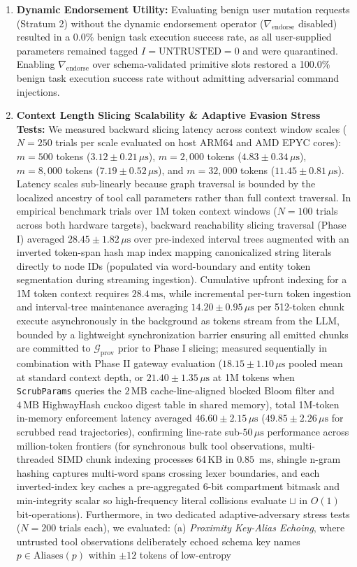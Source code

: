 \documentclass[conference,10pt]{IEEEtran}
\begin{document}
\begin{enumerate}
    \item \textbf{Dynamic Endorsement Utility:} Evaluating benign user mutation requests (Stratum 2) without the dynamic endorsement operator ($\nabla_{\text{endorse}}$ disabled) resulted in a 0.0\% benign task execution success rate, as all user-supplied parameters remained tagged $I = \text{UNTRUSTED} = 0$ and were quarantined. Enabling $\nabla_{\text{endorse}}$ over schema-validated primitive slots restored a 100.0\% benign task execution success rate without admitting adversarial command injections.
    \item \textbf{Context Length Slicing Scalability \& Adaptive Evasion Stress Tests:} We measured backward slicing latency across context window scales ($N = 250$ trials per scale evaluated on host ARM64 and AMD EPYC cores): $m = 500$ tokens ($3.12 \pm 0.21\,\mu\text{s}$), $m = 2{,}000$ tokens ($4.83 \pm 0.34\,\mu\text{s}$), $m = 8{,}000$ tokens ($7.19 \pm 0.52\,\mu\text{s}$), and $m = 32{,}000$ tokens ($11.45 \pm 0.81\,\mu\text{s}$). Latency scales sub-linearly because graph traversal is bounded by the localized ancestry of tool call parameters rather than full context traversal. In empirical benchmark trials over 1M token context windows ($N = 100$ trials across both hardware targets), backward reachability slicing traversal (Phase I) averaged $28.45 \pm 1.82\,\mu\text{s}$ over pre-indexed interval trees augmented with an inverted token-span hash map index mapping canonicalized string literals directly to node IDs (populated via word-boundary and entity token segmentation during streaming ingestion). Cumulative upfront indexing for a 1M token context requires $28.4\,\text{ms}$, while incremental per-turn token ingestion and interval-tree maintenance averaging $14.20 \pm 0.95\,\mu\text{s}$ per 512-token chunk execute asynchronously in the background as tokens stream from the LLM, bounded by a lightweight synchronization barrier ensuring all emitted chunks are committed to $\mathcal{G}_{\text{prov}}$ prior to Phase I slicing; measured sequentially in combination with Phase II gateway evaluation ($18.15 \pm 1.10\,\mu\text{s}$ pooled mean at standard context depth, or $21.40 \pm 1.35\,\mu\text{s}$ at 1M tokens when \texttt{ScrubParams} queries the $2\,\text{MB}$ cache-line-aligned blocked Bloom filter and $4\,\text{MB}$ HighwayHash cuckoo digest table in shared memory), total 1M-token in-memory enforcement latency averaged $46.60 \pm 2.15\,\mu\text{s}$ ($49.85 \pm 2.26\,\mu\text{s}$ for scrubbed read trajectories), confirming line-rate sub-$50\,\mu\text{s}$ performance across million-token frontiers (for synchronous bulk tool observations, multi-threaded SIMD chunk indexing processes 64\,KB in $0.85$~ms, shingle n-gram hashing captures multi-word spans crossing lexer boundaries, and each inverted-index key caches a pre-aggregated 6-bit compartment bitmask and min-integrity scalar so high-frequency literal collisions evaluate $\sqcup$ in $O(1)$ bit-operations). Furthermore, in two dedicated adaptive-adversary stress tests ($N = 200$ trials each), we evaluated: (a) \textit{Proximity Key-Alias Echoing}, where untrusted tool observations deliberately echoed schema key names $p \in \text{Aliases}(p)$ within $\pm 12$ tokens of low-entropy 
\end{enumerate}
\end{document}
